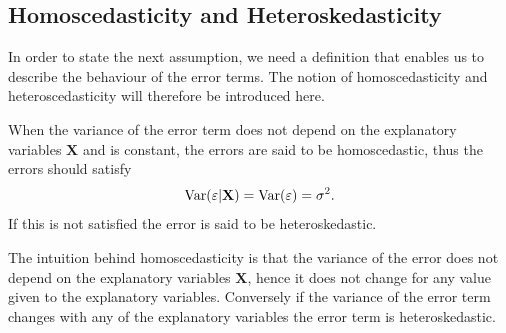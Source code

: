 \subsection{Homoscedasticity and Heteroskedasticity}

In order to state the next assumption, we need a definition that enables us to describe the behaviour of the error terms.
The notion of homoscedasticity and heteroscedasticity will therefore be introduced here.


\begin{definition}
When the variance of the error term does not depend on the explanatory variables $\mathbf{X}$ and is constant, the errors are said to be homoscedastic, thus the errors should satisfy
\begin{align*}
    \operatorname{\text{Var}}(\varepsilon | \mathbf{X}) = \operatorname{\text{Var}}(\varepsilon) = \sigma^2.
\end{align*}
If this is not satisfied the error is said to be heteroskedastic. 
\end{definition}
The intuition behind homoscedasticity is that the variance of the error does not depend on the explanatory variables $\mathbf{X}$, hence it does not change for any value given to the explanatory variables. Conversely if the variance of the error term changes with any of the explanatory variables the error term is heteroskedastic. 

